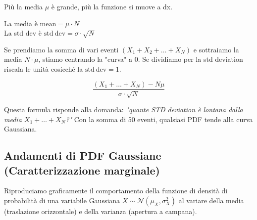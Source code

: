 Più la media $\mu$ è grande, più la funzione si muove a dx.

La media è $\mathrm{mean} = \mu \cdot N$ \\
La std dev è $\mathrm{std\ dev} = \sigma \cdot \sqrt{N}$

Se prendiamo la somma di vari eventi $(X_1 + X_2 + \dots + X_N)$ e sottraiamo la media $N \cdot \mu$, stiamo centrando la "curva" a 0.
Se dividiamo per la std deviation riscala le unità cosicché la $\mathrm{std\ dev} = 1$.

\begin{equation}
\frac{(X_1 + \dots + X_N) - N\mu}{\sigma \cdot \sqrt{N}}
\end{equation}

Questa formula risponde alla domanda: \textit{"quante STD deviation è lontana dalla media $X_1 + \dots + X_N$?"}
Con la somma di 50 eventi, qualsiasi PDF tende alla curva Gaussiana.

\newpage
\subsection{Andamenti di PDF Gaussiane (Caratterizzazione marginale)}

Riproduciamo graficamente il comportamento della funzione di densità di probabilità di una variabile Gaussiana $X \sim \mathcal{N}(\mu_X, \sigma_X^2)$ al variare della media (traslazione orizzontale) e della varianza (apertura a campana).

